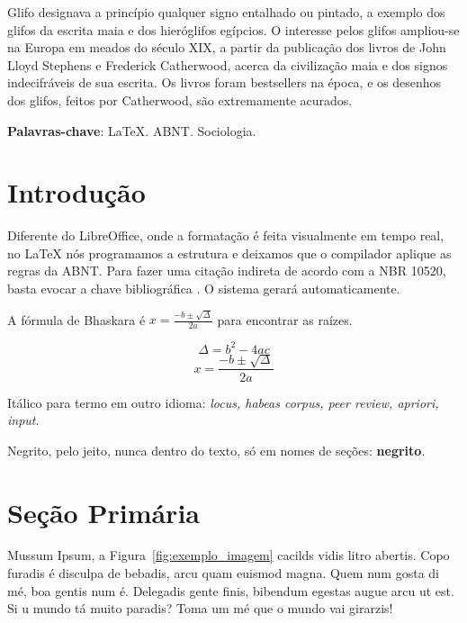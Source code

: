 \documentclass[12pt,article,oneside,a4paper,english,brazil]{abntex2}
\begin{document}
\maketitle

\begin{resumo}
Glifo designava a princípio qualquer signo entalhado ou pintado, a exemplo dos glifos da escrita maia e dos hieróglifos egípcios. O interesse pelos glifos ampliou-se na Europa em meados do século XIX, a partir da publicação dos livros de John Lloyd Stephens e Frederick Catherwood, acerca da civilização maia e dos signos indecifráveis de sua escrita. Os livros foram bestsellers na época, e os desenhos dos glifos, feitos por Catherwood, são extremamente acurados.
 
\noindent
\textbf{Palavras-chave}: LaTeX. ABNT. Sociologia.
\end{resumo}

\tableofcontents*
\cleardoublepage

\textual
\pagestyle{estilo_artigo}

\section{Introdução}
Diferente do LibreOffice, onde a formatação é feita visualmente em tempo real, no LaTeX nós programamos a estrutura e deixamos que o compilador aplique as regras da ABNT. Para fazer uma citação indireta de acordo com a NBR 10520, basta evocar a chave bibliográfica \cite{ClariceLispector48}. O sistema gerará automaticamente.

A fórmula de Bhaskara é $x = \frac{-b \pm \sqrt{\Delta}}{2a}$ para encontrar as raízes.

$$\Delta = b^2 - 4ac$$
$$x = \frac{-b \pm \sqrt{\Delta}}{2a}$$

Itálico para termo em outro idioma: \textit{locus, habeas corpus, peer review, apriori, input}.

Negrito, pelo jeito, nunca dentro do texto, só em nomes de seções: \textbf{negrito}.

\section{Seção Primária}
Mussum Ipsum, a Figura~\ref{fig:exemplo_imagem} cacilds vidis litro abertis. Copo furadis é disculpa de bebadis, arcu quam euismod magna. Quem num gosta di mé, boa gentis num é. Delegadis gente finis, bibendum egestas augue arcu ut est. Si u mundo tá muito paradis? Toma um mé que o mundo vai girarzis!
\end{document}
